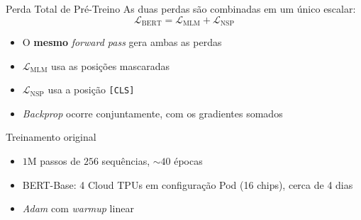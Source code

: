 \documentclass[aspectratio=169, xcolor=dvipsnames]{beamer}
\begin{document}
  \begin{frame}{Perda Total de Pré-Treino}
    As duas perdas são combinadas em um único escalar:
    \[
      \mathcal{L}_{\text{BERT}} = \mathcal{L}_{\text{MLM}} + \mathcal{L}_{\text{NSP}}
    \]
    \vspace{0.3em}
    \begin{itemize}
      \item O \textbf{mesmo} \textit{forward pass} gera ambas as perdas
      \item $\mathcal{L}_{\text{MLM}}$ usa as posições mascaradas
      \item $\mathcal{L}_{\text{NSP}}$ usa a posição \texttt{[CLS]}
      \item \textit{Backprop} ocorre conjuntamente, com os gradientes somados
    \end{itemize}
    \vspace{0.4em}
    \begin{block}{Treinamento original}
      \begin{itemize}
        \item $1$M passos de $256$ sequências, $\sim 40$ épocas
        \item BERT-Base: 4 Cloud TPUs em configuração Pod (16 chips), cerca de 4 dias
        \item \textit{Adam} com \textit{warmup} linear
      \end{itemize}
    \end{block}
  \end{frame}
\end{document}

